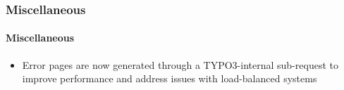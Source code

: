 %

\begin{frame}[fragile]
	\frametitle{Miscellaneous}
	\framesubtitle{Miscellaneous}


	\begin{itemize}
		\item Error pages are now generated through a TYPO3-internal sub-request
			to improve performance and address issues with load-balanced systems
	\end{itemize}

\end{frame}

